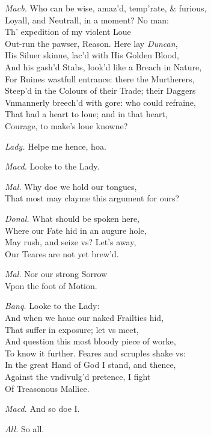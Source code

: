 \documentclass[12pt]{sides}
\newcommand{\dia}[1]{\hskip 15pt\textit{#1}\hskip 6pt}
\begin{document}
\begin{multicols}{2}
            \dia{Macb.} Who can be wise, amaz'd, temp'rate, \& furious, \\ Loyall, and Neutrall, in a moment? No man: \\ Th' expedition of my violent Loue \\ Out-run the pawser, Reason. Here lay \textit{Duncan}, \\ His Siluer skinne, lac'd with His Golden Blood, \\ And his gash'd Stabs, look'd like a Breach in Nature, \\ For Ruines wastfull entrance: there the Murtherers, \\ Steep'd in the Colours of their Trade; their Daggers \\ Vnmannerly breech'd with gore: who could refraine, \\ That had a heart to loue; and in that heart, \\ Courage, to make's loue knowne?

            \dia{Lady.} Helpe me hence, hoa.

            \dia{Macd.} Looke to the Lady.

            \dia{Mal.} Why doe we hold our tongues, \\ That most may clayme this argument for ours?

            \dia{Donal.} What should be spoken here, \\ Where our Fate hid in an augure hole, \\ May rush, and seize vs? Let's away, \\ Our Teares are not yet brew'd.

            \dia{Mal.} Nor our strong Sorrow \\ Vpon the foot of Motion.

            \dia{Banq.} Looke to the Lady: \\ And when we haue our naked Frailties hid, \\ That suffer in exposure; let vs meet, \\ And question this most bloody piece of worke, \\ To know it further. Feares and scruples shake vs: \\ In the great Hand of God I stand, and thence, \\ Against the vndivulg'd pretence, I fight \\ Of Treasonous Mallice.

            \dia{Macd.} And so doe I.

            \dia{All.} So all.


\end{multicols}
\end{document}
